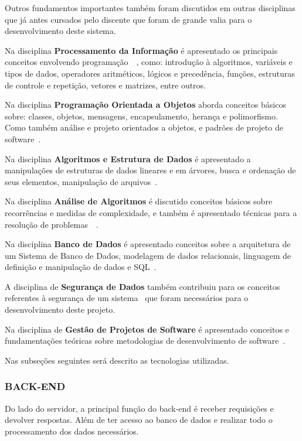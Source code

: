 \documentclass[
  12pt,				%
  openany,
  oneside,
  a4paper,			%
  english,			%
  brazil
]{article}
\numberwithin{figure}{section}
\numberwithin{table}{section}
\begin{document}
Outros fundamentos importantes também foram discutidos em outras disciplinas que já antes cursados pelo discente que foram de grande valia para o desenvolvimento deste sistema.

Na disciplina \textbf{Processamento da Informação} é apresentado os principais conceitos envolvendo programação~\cite{BCC1}~\cite{BCC2}, como: introdução à algoritmos, variáveis e tipos de dados, operadores aritméticos, lógicos e precedência, funções, estruturas de controle e repetição, vetores e matrizes, entre outros.

Na disciplina \textbf{Programação Orientada a Objetos} aborda conceitos básicos sobre: classes, objetos, mensagens, encapsulamento, herança e polimorfismo. Como também análise e projeto orientados a objetos, e padrões de projeto de software~\cite{POO_deitel}.

Na disciplina \textbf{Algoritmos e Estrutura de Dados} é apresentado a  manipulações de estruturas de dados lineares e em árvores, busca e ordenação de seus elementos, manipulação de arquivos~\cite{AED_cormen1}.

Na disciplina \textbf{Análise de Algoritmos} é discutido conceitos básicos sobre recorrências e medidas de complexidade, e também é apresentado técnicas para a resolução de problemas~\cite{AED_cormen1}~\cite{AED_cormen2}.

Na disciplina \textbf{Banco de Dados} é apresentado conceitos sobre a arquitetura de um Sistema de Banco de Dados, modelagem de dados relacionais, linguagem de definição e manipulação de dados e SQL~\cite{BD}.

A disciplina de \textbf{Segurança de Dados} também contribuiu para os conceitos referentes à segurança de um sistema~\cite{SegDados} que foram necessários para o desenvolvimento deste projeto.

Na disciplina de \textbf{ Gestão de Projetos de Software} é apresentado conceitos e fundamentações teóricas sobre metodologias de desenvolvimento de software~\cite{kerzner2006gestao}\cite{vargas2005gerenciamento}.

Nas subseções seguintes será descrito as tecnologias utilizadas.

\subsubsection{BACK-END}
Do lado do servidor, a principal função do back-end é receber requisições e devolver respostas. Além de ter acesso ao banco de dados e realizar todo o processamento dos dados necessários.
\end{document}
